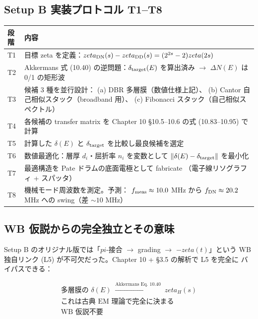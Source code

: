 \documentclass[11pt,a4paper]{article}
\def\pi{pi}%
\def\zeta{zeta}%
\def\textbf#1{#1}%
\begin{document}
\subsection{Setup B 実装プロトコル T1--T8}

\begin{center}
\begin{tabular}{p{}p{}}
\toprule
段階 & 内容 \\
\midrule
T1 & 目標 zeta を定義：$\zeta_{\rm DN}(s) - \zeta_{\rm DD}(s) = (2^{2s}-2)\zeta(2s)$ \\
T2 & Akkermans 式 (10.40) の逆問題：$\delta_{\rm target}(E)$ を算出済み
  $\to$ $\Delta N(E)$ は 0/1 の矩形波 \\
T3 & 候補 3 種を並行設計：
  (a) DBR 多層膜（数値仕様上記）、
  (b) Cantor 自己相似スタック（broadband 用）、
  (c) Fibonacci スタック（自己相似スペクトル） \\
T4 & 各候補の transfer matrix を Chapter 10 §10.5--10.6 の式 (10.83--10.95) で計算 \\
T5 & 計算した $\delta(E)$ と $\delta_{\rm target}$ を比較し最良候補を選定 \\
T6 & 数値最適化：層厚 $d_i$・屈折率 $n_i$ を変数として
  $\|\delta(E) - \delta_{\rm target}\|$ を最小化 \\
T7 & 最適構造を Pate ドラムの底面電極として fabricate
  （電子線リソグラフィ + スパッタ） \\
T8 & 機械モード周波数を測定。予測：
  $f_{\rm meas} \approx 10.0$ MHz から $f_{\rm DN} \approx 20.2$ MHz への
  swing（差 $\sim 10$ MHz） \\
\bottomrule
\end{tabular}
\end{center}

\subsection{WB 仮説からの完全独立とその意味}

Setup B のオリジナル版では「$\pi$-接合 $\to$ grading $\to$ $-\zeta(t)$」という
WB 独自リンク (L5) が不可欠だった。Chapter 10 + §3.5 の解析で \textbf{L5 を完全に
バイパスできる}：

\begin{tcolorbox}[colback=blue!5,colframe=blue!50!black]
\[
\boxed{\;
\begin{array}{c}
\text{多層膜の } \delta(E) \;\xrightarrow{\text{Akkermans Eq.\ 10.40}}\; \zeta_H(s)\\[4pt]
\text{これは古典 EM 理論で完全に決まる}\\[4pt]
\text{WB 仮説不要}
\end{array}
\;}
\]
\end{tcolorbox}
\end{document}
